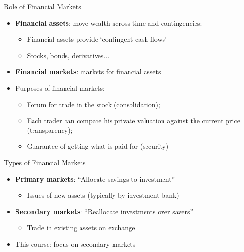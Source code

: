 \begin{frame}{Role of Financial Markets}
\begin{itemize}
	\item \textbf{Financial assets}: move wealth across time and contingencies: 
	\begin{itemize}
		\item Financial assets provide `contingent cash flows'
		\item Stocks, bonds, derivatives...
	\end{itemize}
	\item \textbf{Financial markets}: markets for financial assets
	\item Purposes of financial markets:
	\begin{itemize}
		\item Forum for trade in the stock (\alert{consolidation});
		\item Each trader can compare his private valuation against the current price (\alert{transparency});
		\item Guarantee of getting what is paid for (\alert{security})
	\end{itemize}
\end{itemize}
\end{frame}


\begin{frame}{Types of Financial Markets}
\begin{itemize} 
	\item \textbf{Primary markets}: ``Allocate savings to investment''
	\begin{itemize}
		\item Issues of new assets (typically by investment bank)
	\end{itemize}
	\item \textbf{Secondary markets}: ``Reallocate investments over savers''
	\begin{itemize}
		\item Trade in existing assets on exchange
	\end{itemize}	
	\item This course: focus on secondary markets 
\end{itemize}
\end{frame}


